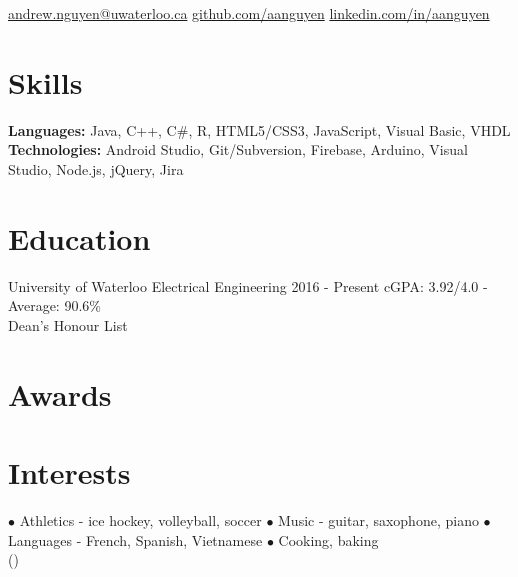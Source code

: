 \documentclass[]{aanguyen_res}
\begin{document}
	\begin{sidebar}%
		\vspace{35pt}%
			\iconentry{\faEnvelope}\href{mailto:andrew.nguyen@uwaterloo.ca}{andrew.nguyen@uwaterloo.ca}
			\iconentry{\faGithub}\href{http://github.com/aanguyen}{github.com/aanguyen}
			\iconentry{\faLinkedin}\href{http://www.linkedin.com/in/aanguyen}{linkedin.com/in/aanguyen}
			\vspace{0.75cm}%
		\section{Skills}
			\textbf{Languages: }Java, C++, C\#, R, HTML5/CSS3, JavaScript, Visual Basic, VHDL
			\vspace{0.15cm}%
			\textbf{Technologies: }Android Studio, Git/Subversion, Firebase, Arduino, Visual Studio, Node.js, jQuery, Jira
			\vspace{1cm}%
		\section{Education}
			\eduentry%
				{University of Waterloo}%
				{Electrical Engineering}%
				{2016 - Present}%
				{cGPA: 3.92/4.0 - Average: 90.6\%\\Dean's Honour List}
			\vspace{0.65cm}%
		\section{Awards}
			\vspace{0.65cm}%
		\section{Interests}
		$\bullet$ Athletics - ice hockey, volleyball, soccer
		$\bullet$ Music - guitar, saxophone, piano
		$\bullet$ Languages - French, Spanish, Vietnamese
		$\bullet$ Cooking, baking\\()
	\end{sidebar}%
\end{document}
